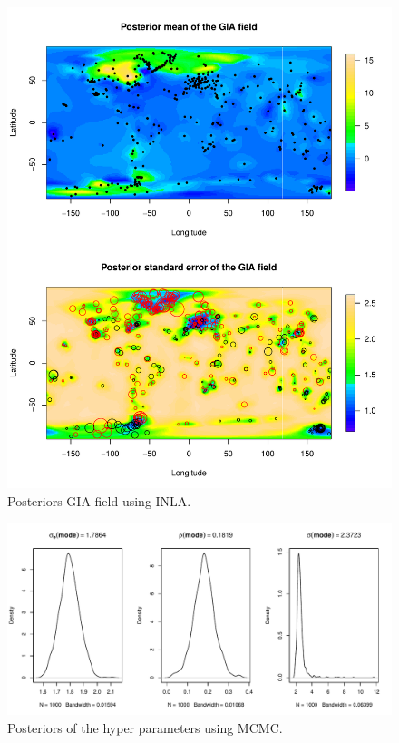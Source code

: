 \documentclass[a4paper,12pt]{article}
\begin{document}
\begin{figure}[htbp]
 \begin{center}
 \includegraphics[scale=0.8]{fig/1bsMesh_GIAfield.pdf}
 \end{center}
 \caption[Posterior field]{Posteriors GIA field using INLA.}
 \label{fig:5}
 \end{figure}
 
 \begin{figure}[htbp]
 \begin{center}
 \includegraphics[scale=0.8]{fig/1bslice1_1000_hyperpars.pdf}
 \end{center}
 \caption[Posterior hyper parameters]{Posteriors of the hyper parameters using MCMC.}
 \label{fig:5}
 \end{figure}
 
\end{document}
